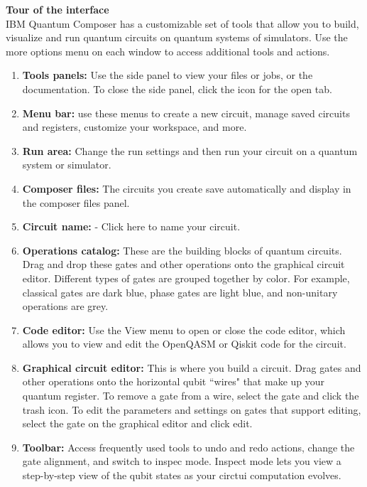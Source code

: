 \textbf{Tour of the interface}\\
IBM Quantum Composer has a customizable set of tools that allow you to build, visualize and run quantum circuits on quantum systems of simulators. Use the more options menu on each window to access additional tools and actions.
\begin{enumerate}
    \item \textbf{Tools panels:} Use the side panel to view your files or jobs, or the documentation. To close the side panel, click the icon for the open tab.
    \item \textbf{Menu bar:} use these menus to create a new circuit, manage saved circuits and registers, customize your workspace, and more.
    \item \textbf{Run area:} Change the run settings and then run your circuit on a quantum system or simulator.
    \item \textbf{Composer files:} The circuits you create save automatically and display in the composer files panel.
    \item \textbf{Circuit name:} - Click here to name your circuit.
    \item \textbf{Operations catalog:} These are the building blocks of quantum circuits. Drag and drop these gates and other operations onto the graphical circuit editor. Different types of gates are grouped together by color. For example, classical gates are dark blue, phase gates are light blue, and non-unitary operations are grey.
    \item \textbf{Code editor:} Use the View menu to open or close the code editor, which allows you to view and edit the OpenQASM or Qiskit code for the circuit.
    \item \textbf{Graphical circuit editor:} This is where you build a circuit. Drag gates and other operations onto the horizontal qubit ``wires" that make up your quantum register. To remove a gate from a wire, select the gate and click the trash icon. To edit the parameters and settings on gates that support editing, select the gate on the graphical editor and click edit.
    \item \textbf{Toolbar:} Access frequently used tools to undo and redo actions, change the gate alignment, and switch to inspec mode. Inspect mode lets you view a step-by-step view of the qubit states as your circtui computation evolves. 
\end{enumerate}




\chapterreferences
